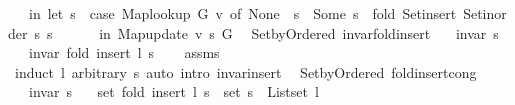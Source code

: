 \begin{isabellebody}
\ \ \ in\ let\ s{\isacharprime}{\kern0pt}\ {\isacharequal}{\kern0pt}\ case\ Map{\isacharunderscore}{\kern0pt}lookup\ G\ v\ of\ None\ {\isasymRightarrow}\ s\ {\isacharbar}{\kern0pt}\ Some\ s{\isacharprime}{\kern0pt}{\isacharprime}{\kern0pt}\ {\isasymRightarrow}\ fold\ Set{\isacharunderscore}{\kern0pt}insert\ {\isacharparenleft}{\kern0pt}Set{\isacharunderscore}{\kern0pt}inorder\ s{\isacharparenright}{\kern0pt}\ s{\isacharprime}{\kern0pt}{\isacharprime}{\kern0pt}\isanewline
\ \ \ \ \ \ in\ Map{\isacharunderscore}{\kern0pt}update\ v\ s{\isacharprime}{\kern0pt}\ G{\isachardoublequoteclose}\isanewline
%
\isadeliminvisible
\isanewline
%
\endisadeliminvisible
%
\isataginvisible
{}\isamarkupfalse%
\ {\isacharparenleft}{\kern0pt}\ Set{\isacharunderscore}{\kern0pt}by{\isacharunderscore}{\kern0pt}Ordered{\isacharparenright}{\kern0pt}\ invar{\isacharunderscore}{\kern0pt}fold{\isacharunderscore}{\kern0pt}insert{\isacharcolon}{\kern0pt}\isanewline
\ \ \ {\isachardoublequoteopen}invar\ s{\isachardoublequoteclose}\isanewline
\ \ \ {\isachardoublequoteopen}invar\ {\isacharparenleft}{\kern0pt}fold\ insert\ l\ s{\isacharparenright}{\kern0pt}{\isachardoublequoteclose}%
\endisataginvisible
{\isafoldinvisible}%
%
\isadeliminvisible
\isanewline
%
\endisadeliminvisible
%
\isadelimproof
\ \ %
\endisadelimproof
%
\isatagproof
{}\isamarkupfalse%
\ assms\isanewline
\ \ \isamarkupfalse%
\ {\isacharparenleft}{\kern0pt}induct\ l\ arbitrary{\isacharcolon}{\kern0pt}\ s{\isacharparenright}{\kern0pt}\ {\isacharparenleft}{\kern0pt}auto\ intro{\isacharcolon}{\kern0pt}\ invar{\isacharunderscore}{\kern0pt}insert{\isacharparenright}{\kern0pt}%
\endisatagproof
{\isafoldproof}%
%
\isadelimproof
\isanewline
%
\endisadelimproof
%
\isadeliminvisible
\isanewline
%
\endisadeliminvisible
%
\isataginvisible
{}\isamarkupfalse%
\ {\isacharparenleft}{\kern0pt}\ Set{\isacharunderscore}{\kern0pt}by{\isacharunderscore}{\kern0pt}Ordered{\isacharparenright}{\kern0pt}\ fold{\isacharunderscore}{\kern0pt}insert{\isacharunderscore}{\kern0pt}cong{\isacharcolon}{\kern0pt}\isanewline
\ \ \ {\isachardoublequoteopen}invar\ s{\isachardoublequoteclose}\isanewline
\ \ \ {\isachardoublequoteopen}set\ {\isacharparenleft}{\kern0pt}fold\ insert\ l\ s{\isacharparenright}{\kern0pt}\ {\isacharequal}{\kern0pt}\ set\ s\ {\isasymunion}\ List{\isachardot}{\kern0pt}set\ l{\isachardoublequoteclose}%
\endisataginvisible
{\isafoldinvisible}%
%
\isadeliminvisible
\isanewline

\end{isabellebody}
